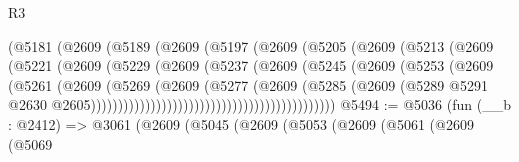 \begin{lexlean}{R3}
\begin{coremodule}
                                    (@5181
                                      (@2609
                                        (@5189
                                          (@2609
                                            (@5197
                                              (@2609
                                                (@5205
                                                  (@2609
                                                    (@5213
                                                      (@2609
                                                        (@5221
                                                          (@2609
                                                            (@5229
                                                              (@2609
                                                                (@5237
                                                                  (@2609
                                                                    (@5245
                                                                      (@2609
                                                                        (@5253
                                                                          (@2609
                                                                            (@5261
                                                                              (@2609
                                                                                (@5269
                                                                                  (@2609
                                                                                    (@5277
                                                                                      (@2609
                                                                                        (@5285
                                                                                          (@2609
                                                                                            (@5289
                                                                                              @5291
                                                                                              @2630
                                                                                              @2605)))))))))))))))))))))))))))))))))))))))))))))
@5494 := @5036
    (fun (__b : @2412) =>
    @3061
      (@2609
        (@5045
          (@2609
            (@5053
              (@2609
                (@5061
                  (@2609
                    (@5069

\end{coremodule}
\end{lexlean}
